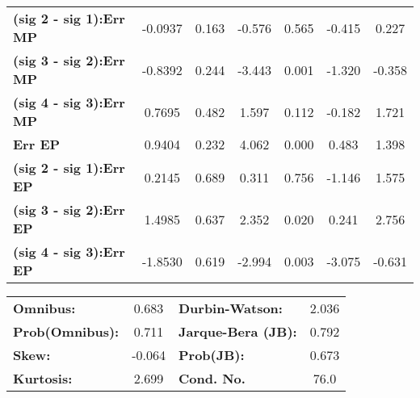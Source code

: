 \begin{center}
\begin{tabular}{lcccccc}
\textbf{(sig 2 - sig 1):Err MP} &      -0.0937  &        0.163     &    -0.576  &         0.565        &       -0.415    &        0.227     \\
\textbf{(sig 3 - sig 2):Err MP} &      -0.8392  &        0.244     &    -3.443  &         0.001        &       -1.320    &       -0.358     \\
\textbf{(sig 4 - sig 3):Err MP} &       0.7695  &        0.482     &     1.597  &         0.112        &       -0.182    &        1.721     \\
\textbf{Err EP}                 &       0.9404  &        0.232     &     4.062  &         0.000        &        0.483    &        1.398     \\
\textbf{(sig 2 - sig 1):Err EP} &       0.2145  &        0.689     &     0.311  &         0.756        &       -1.146    &        1.575     \\
\textbf{(sig 3 - sig 2):Err EP} &       1.4985  &        0.637     &     2.352  &         0.020        &        0.241    &        2.756     \\
\textbf{(sig 4 - sig 3):Err EP} &      -1.8530  &        0.619     &    -2.994  &         0.003        &       -3.075    &       -0.631     \\
\bottomrule
\end{tabular}
\end{center}\begin{center}
\begin{tabular}{lclc}
\toprule
\textbf{Omnibus:}       &  0.683 & \textbf{  Durbin-Watson:     } &    2.036  \\
\textbf{Prob(Omnibus):} &  0.711 & \textbf{  Jarque-Bera (JB):  } &    0.792  \\
\textbf{Skew:}          & -0.064 & \textbf{  Prob(JB):          } &    0.673  \\
\textbf{Kurtosis:}      &  2.699 & \textbf{  Cond. No.          } &     76.0  \\
\bottomrule
\end{tabular}
\end{center}



